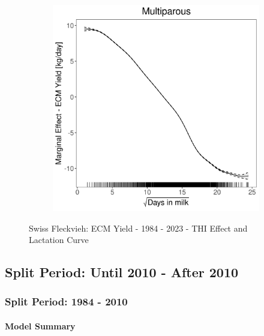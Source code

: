 \begin{figure}[H]
\begin{subfigure}[b]{0.45\textwidth}
    \end{subfigure}
    \hspace{0.05\textwidth} %
    \begin{subfigure}[b]{0.45\textwidth}
        \centering
        \includegraphics[width=\textwidth]{thesis/figures/models/ecm/full/sf_ecm_full/sf_ecm_full_marginal_dim_milk_multi.png}
    \end{subfigure}
    \caption[]{Swiss Fleckvieh: ECM Yield - 1984 - 2023 - THI Effect and Lactation Curve}
    \label{fig:main}
\end{figure}

\subsection{Split Period: Until 2010 - After 2010}
\subsubsection{Split Period: 1984 - 2010}\label{model:sf_ecm_before}

\paragraph{Model Summary} \quad \\

